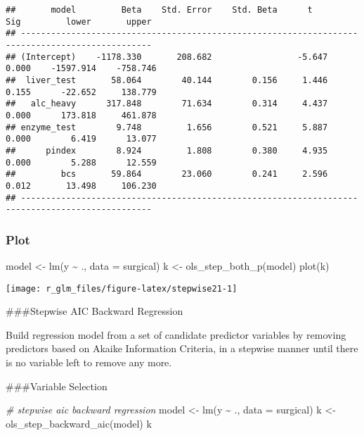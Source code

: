 \documentclass[
]{article}
\newenvironment{Shaded}{\begin{snugshade}}{\end{snugshade}}
\newcommand{\AttributeTok}[1]{\textcolor[rgb]{0.77,0.63,0.00}{#1}}
\newcommand{\CommentTok}[1]{\textcolor[rgb]{0.56,0.35,0.01}{\textit{#1}}}
\newcommand{\FunctionTok}[1]{\textcolor[rgb]{0.00,0.00,0.00}{#1}}
\newcommand{\NormalTok}[1]{#1}
\newcommand{\OtherTok}[1]{\textcolor[rgb]{0.56,0.35,0.01}{#1}}
\newcommand{\SpecialCharTok}[1]{\textcolor[rgb]{0.00,0.00,0.00}{#1}}
\begin{document}
\begin{verbatim}
##       model         Beta    Std. Error    Std. Beta      t        Sig         lower       upper 
## ------------------------------------------------------------------------------------------------
## (Intercept)    -1178.330       208.682                 -5.647    0.000    -1597.914    -758.746 
##  liver_test       58.064        40.144        0.156     1.446    0.155      -22.652     138.779 
##   alc_heavy      317.848        71.634        0.314     4.437    0.000      173.818     461.878 
## enzyme_test        9.748         1.656        0.521     5.887    0.000        6.419      13.077 
##      pindex        8.924         1.808        0.380     4.935    0.000        5.288      12.559 
##         bcs       59.864        23.060        0.241     2.596    0.012       13.498     106.230 
## ------------------------------------------------------------------------------------------------
\end{verbatim}

\hypertarget{plot}{%
\subsubsection{Plot}\label{plot}}

\begin{Shaded}
\begin{Highlighting}[]
\NormalTok{model }\OtherTok{\textless{}{-}} \FunctionTok{lm}\NormalTok{(y }\SpecialCharTok{\textasciitilde{}}\NormalTok{ ., }\AttributeTok{data =}\NormalTok{ surgical)}
\NormalTok{k }\OtherTok{\textless{}{-}} \FunctionTok{ols\_step\_both\_p}\NormalTok{(model)}
\FunctionTok{plot}\NormalTok{(k)}
\end{Highlighting}
\end{Shaded}

\begin{center}\texttt{[image: r\_glm\_files/figure-latex/stepwise21-1]} \end{center}

\#\#\#Stepwise AIC Backward Regression

Build regression model from a set of candidate predictor variables by
removing predictors based on Akaike Information Criteria, in a stepwise
manner until there is no variable left to remove any more.

\#\#\#Variable Selection

\begin{Shaded}
\begin{Highlighting}[]
\CommentTok{\# stepwise aic backward regression}
\NormalTok{model }\OtherTok{\textless{}{-}} \FunctionTok{lm}\NormalTok{(y }\SpecialCharTok{\textasciitilde{}}\NormalTok{ ., }\AttributeTok{data =}\NormalTok{ surgical)}
\NormalTok{k }\OtherTok{\textless{}{-}} \FunctionTok{ols\_step\_backward\_aic}\NormalTok{(model)}
\NormalTok{k}
\end{Highlighting}
\end{Shaded}
\end{document}
